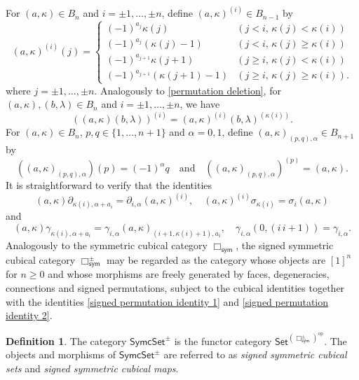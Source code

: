 \documentclass[oneside, 12pt]{amsart}
\numberwithin{equation}{section}
\theoremstyle{plain}
\theoremstyle{definition}
\newtheorem{definition}[theorem]{Definition}
\theoremstyle{remark}
\newcommand{\SymcSet}{\mathsf{SymcSet}}
\begin{document}
	
	For $(a,\kappa)\in B_n$ and $i=\pm 1,\ldots,\pm n$, define $(a,\kappa)^{(i)}\in B_{n-1}$ by
	\[
	(a,\kappa)^{(i)}(j)=
	\begin{cases}
		(-1)^{a_j}\kappa(j)&(j<i,\,\kappa(j)<\kappa(i))\\
		(-1)^{a_j}(\kappa(j)-1)&(j<i,\,\kappa(j)\ge\kappa(i))\\
		(-1)^{a_{j+1}}\kappa(j+1)&(j\ge i,\,\kappa(j)<\kappa(i))\\
		(-1)^{a_{j+1}}(\kappa(j+1)-1)&(j\ge i,\,\kappa(j)\ge\kappa(i)).
	\end{cases}
	\]
	where $j=\pm 1,\ldots,\pm n$. Analogously to \eqref{permutation deletion}, for $(a,\kappa),(b,\lambda)\in B_n$ and $i=\pm 1,\ldots,\pm n$, we have
	\[
	((a,\kappa)(b,\lambda))^{(i)}=(a,\kappa)^{(i)}(b,\lambda)^{(\kappa(i))}.
	\]
	For $(a,\kappa)\in B_n$, $p,q\in\{1,\ldots,n+1\}$ and $\alpha=0,1$, define $(a,\kappa)_{(p,q),\alpha}\in B_{n+1}$ by
	\[
	((a,\kappa)_{(p,q),\alpha})(p)=(-1)^\alpha q\quad\text{and}\quad((a,\kappa)_{(p,q),\alpha})^{(p)}=(a,\kappa).
	\]
	It is straightforward to verify that the identities
	\begin{equation}
		\label{signed permutation identity 1}
		(a,\kappa)\partial_{\kappa(i),\alpha+a_i}=\partial_{i,\alpha}(a,\kappa)^{(i)},\quad(a,\kappa)^{(i)}\sigma_{\kappa(i)}=\sigma_i(a,\kappa)
	\end{equation}
	and
	\begin{equation}
		\label{signed permutation identity 2}
		(a,\kappa)\gamma_{\kappa(i),\alpha+a_i}=\gamma_{i,\alpha}(a,\kappa)_{(i+1,\kappa(i)+1),a_i},\quad\gamma_{i,\alpha}(0,(i\,i+1))=\gamma_{i,\alpha}.
	\end{equation}
	Analogously to the symmetric cubical category $\Box_\mathsf{sym}$, the signed symmetric cubical category $\Box_\mathsf{sym}^\pm$ may be regarded as the category whose objects are $[1]^n$ for $n\ge0$ and whose morphisms are freely generated by faces, degeneracies, connections and signed permutations, subject to the cubical identities together with the identities \eqref{signed permutation identity 1} and \eqref{signed permutation identity 2}.
	
	
	
	\begin{definition}
		The category $\SymcSet^\pm$ is the functor category $\mathsf{Set}^{(\Box_\mathsf{sym}^\pm)^\mathrm{op}}$. The objects and morphisms of $\SymcSet^\pm$ are referred to as \emph{signed symmetric cubical sets} and \emph{signed symmetric cubical maps}.
	\end{definition}
	
\end{document}
